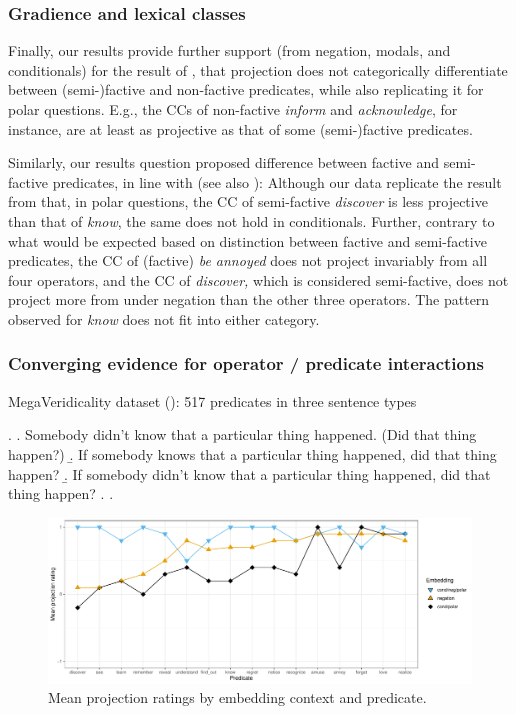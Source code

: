 \documentclass[a4paper,12pt,twoside]{article}
\begin{document}
		\subsubsection{Gradience and lexical classes}

			Finally, our results provide further support (from negation, modals, and conditionals) for the result of \citet{degen_are_2022}, that projection does not categorically differentiate between (semi-)factive and non-factive predicates, while also replicating it for polar questions. 
			E.g., the CCs of non-factive \emph{inform} and \emph{acknowledge}, for instance, are at least as projective as that of some (semi-)factive predicates.

			Similarly, our results question  proposed difference between factive and semi-factive predicates, in line with \citet{sieker_projective_2022} (see also \citealt{beaver_have_2010}): Although our data replicate the result from \citet{tonhauser_how_2018} that, in polar questions, the CC of semi-factive \emph{discover} is less projective than that of \emph{know}, the same does not hold in conditionals.
			Further, contrary to what would be expected based on  distinction between factive and semi-factive predicates, the CC of (factive) \emph{be annoyed} does not project invariably from all four operators, and the CC of \emph{discover,}  which is considered semi-factive, does not project more from under negation than the other three operators. The pattern observed for {\em know} does not fit into either category.

		\subsubsection{Converging evidence for operator / predicate interactions}
			MegaVeridicality dataset (\citealt{white_role_2018}): 517 predicates in three sentence types

			\ex. \a. Somebody didn’t know that a particular thing happened. (Did that thing happen?)
				\b. If somebody knows that a particular thing happened, did that thing happen?
				\b. If somebody didn’t know that a particular thing happened, did that thing happen?
				\z.
			\z.


			\begin{figure}[ht]
				\centering
				\includegraphics[width = \linewidth]{mega-veridicality}
				\caption{Mean projection ratings by embedding context and predicate.}
				\label{fig:figure1}
			\end{figure}
\end{document}
